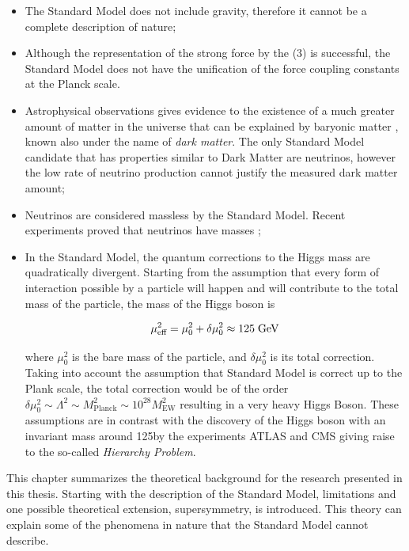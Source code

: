 \begin{itemize}
	\item The Standard Model does not include gravity, therefore it cannot be a complete description of nature;
	\item Although the representation of the strong force by the (3) is successful, the Standard Model does not have the unification of the force coupling constants at the Planck scale.
	\item Astrophysical observations gives evidence to the existence of a much greater amount of matter in the universe that can be explained by baryonic matter \cite{deBoer:2005tm}, known also under the name of \textit{dark matter}. The only Standard Model candidate that has properties similar to Dark Matter are neutrinos, however the low rate of neutrino production cannot justify the measured dark matter amount;
	\item Neutrinos are considered massless by the Standard Model. Recent experiments proved that neutrinos have masses \cite{Fukuda:1998mi};
	\item In the Standard Model, the quantum corrections to the Higgs mass are quadratically divergent. Starting from the assumption that every form of interaction possible by a particle will happen and will contribute to the total mass of the particle, the mass of the Higgs boson is 
	
	\begin{equation}
	\mu^{2}_{\text{eff}} = \mu^{2}_{0} + \delta\mu^{2}_{0} \approx 125\;\text{Ge}\kern-0.06667em\text{V}
	\end{equation}
	
	where $\mu^{2}_{0}$ is the bare mass of the particle, and $\delta\mu^{2}_{0} $ is its total correction. Taking into account the assumption that Standard Model is correct up to the Plank scale, the total correction would be of the order  $\delta\mu^{2}_{0}  \sim \Lambda^{2} \sim M^{2}_{\text{Planck}} \sim 10^{28}M^{2}_{\text{EW}}$ resulting in a very heavy Higgs Boson. These assumptions are in contrast with the discovery of the Higgs boson with an invariant mass around 125\gev by the experiments ATLAS \cite{Aad:2012tfa} and CMS \cite{Chatrchyan:2012xdj} giving raise to the so-called \textit{Hierarchy Problem}.
	
\end{itemize}

\clearpage



This chapter summarizes the theoretical background for the research presented in this thesis. Starting with the description of the Standard Model,  limitations and one possible theoretical extension, supersymmetry, is introduced. This theory can explain some of the phenomena in nature that the Standard Model cannot describe.

